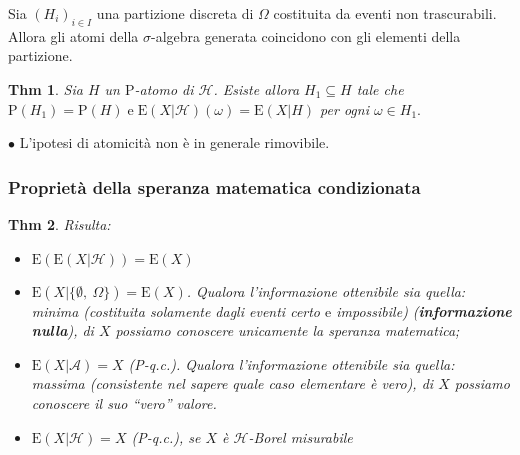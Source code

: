 \documentclass[a4paper,11pt]{article}
\theoremstyle{plain}
\newtheorem{thm}{Thm}[section]
\theoremstyle{definition}
\theoremstyle{remark}
\begin{document}
\noindent
Sia $(H_{i})_{i\in I}$ una partizione discreta di $\Omega$ costituita da eventi non trascurabili. Allora gli atomi della $\sigma$-algebra generata coincidono con gli elementi della partizione.

\begin{thm}
Sia $H$ un $\mathrm{P}$-atomo di $\mathcal{H}$. Esiste allora $H_{1}\subseteq H$ tale che $\mathrm{P}(H_{1})= \mathrm{P}(H)\mathrm{ \;e \; }\mathrm{E}(X|\mathcal{H})(\omega)=\mathrm{E}(X|H)$ per ogni $\omega\in H_{1}.$
\end{thm}

\noindent
$\bullet$ L'ipotesi di atomicità non è in generale rimovibile.
\subsubsection{Proprietà della speranza matematica condizionata}
\begin{thm} Risulta:
\begin{itemize}
    \item $ \mathrm{E}(\mathrm{E}(X|\mathcal{H}))=\mathrm{E}(X)$
    \item $ \mathrm{E}(X|\{\emptyset,\ \Omega\})=\mathrm{E}(X)$. Qualora l'informazione ottenibile sia quella: minima (costituita solamente dagli eventi certo $\mathrm{e}$ impossibile) (\textbf{informazione nulla}), di $X$ possiamo conoscere unicamente la speranza matematica;
    \item $\mathrm{E}(X|\mathcal{A})=X$ (P-q.c.). Qualora l'informazione ottenibile sia quella: massima (consistente nel sapere quale caso elementare è vero), di $X$ possiamo conoscere il suo ``vero'' valore. 
    \item $ \mathrm{E}(X|\mathcal{H})=X$ (P-q.c.), se $X$ è $\mathcal{H}$-Borel misurabile
\end{itemize}
\end{thm}
\end{document}
